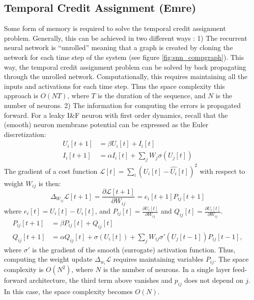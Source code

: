 \documentclass[journal,onecolumn,11pt]{IEEEtran}
\begin{document}
\subsection{Temporal Credit Assignment (Emre)}
\label{sec:temporal_credit_assignment}
Some form of memory is required to solve the temporal credit assignment problem. 
Generally, this can be achieved in two different ways \cite{Williams_Zipser89_learalgo}:
1) The recurrent neural network is ``unrolled'' meaning that a graph is created by cloning the network for each time step of the system (see figure \ref{fig:snn_compgraph}). This way, the temporal credit assignment problem can be solved by back propagating through the unrolled network. Computationally, this requires maintaining all the inputs and activations for each time step. Thus the space complexity this approach is $O(N T)$, where $T$ is the duration of the sequence, and $N$ is the number of neurons.
2) The information for computing the errors is propagated forward.
For a leaky I\&F neuron with first order dynamics, recall that the (smooth) neuron membrane potential can be expressed as the Euler discretization:
\[
\begin{split}
U_i[t+1] & = \beta U_i[t] + I_i[t]\\
I_i[t+1] & = \alpha I_i[t] + \sum_j W_j \sigma(U_j[t])
\end{split}
\]
The gradient of a cost function $\mathcal{L}[t] = \sum_i (U_i[t]-\hat{U_i}[t])^2$ with respect to weight $W_{ij}$ is then:
\[
\Delta_{W_{ij}} \mathcal{L}[t+1] = \frac{\partial \mathcal{L}[t+1]}{\partial W_{ij}} = e_i[t+1] P_{ij}[t+1]
\]
where $e_i[t] = U_i[t]-\hat{U_i}[t]$, and $P_{ij}[t] = \frac{\partial U_i[t]} {\partial W_{ij}}$ and $Q_{ij}[t] = \frac{\partial U_i[t]} {\partial W_{ij}}$.
\[
\begin{split}
 P_{ij}[t+1] &= \beta P_{ij}[t] + Q_{ij}[t]\\
 Q_{ij}[t+1] &= \alpha Q_{ij}[t] + \sigma(U_i[t]) + \sum_j W_{ij} \sigma'(U_j[t-1]) P_{ij}[t-1],
\end{split}
\]  
where $\sigma'$ is the gradient of the smooth (surrogate) activation function.
Thus, computing the weight update $\Delta_{w_i} \mathcal{L}$ requires maintaining variables $P_{ij}$. The space complexity is $O(N^2)$, where $N$ is the number of neurons. In a single layer feed-forward architecture, the third term above vanishes and $p_{ij}$ does not depend on $j$. In this case, the space complexity becomes $O(N)$. 
\end{document}
